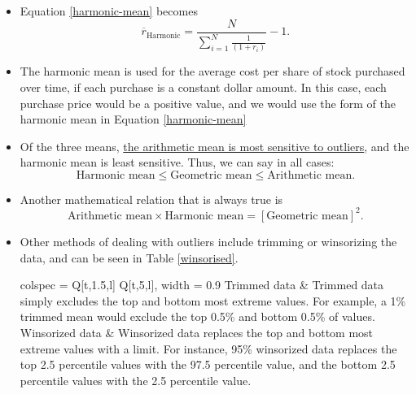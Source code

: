 \documentclass[../notes_compiled.tex]{subfiles}
\begin{document}
\begin{itemize}
\item[] Equation \ref{harmonic-mean} becomes
\begin{equation}
\overline{r}_{\text{Harmonic}} = \frac{N}{\sum_{i=1}^{N}\frac{1}{(1+r_{i})}} -1.
\end{equation}

\item The harmonic mean is used for the average cost per share of stock purchased over time, if each purchase is a constant dollar amount. In this case, each purchase price would be a positive value, and we would use the form of the harmonic mean in Equation \ref{harmonic-mean}

\item Of the three means, \underline{the arithmetic mean is most sensitive to outliers}, and the harmonic mean is least sensitive. Thus, we can say in all cases:
\begin{equation*}
\text{Harmonic mean} \leq \text{Geometric mean} \leq \text{Arithmetic mean}.
\end{equation*}

\item Another mathematical relation that is always true is 
\begin{equation*}
\text{Arithmetic mean} \times \text{Harmonic mean} = \left[\text{Geometric mean}\right]^{2}.
\end{equation*}

\item Other methods of dealing with outliers include trimming or winsorizing the data, and can be seen in Table \ref{winsorised}.

\begin{table}[H]
\centering
\begin{tblr}{colspec = {Q[t,1.5,l] Q[t,5,l]}, width = 0.9\textwidth}
\hline[1.25pt]
Trimmed data & Trimmed data simply excludes the top and bottom most extreme values. For example, a 1\% trimmed mean would exclude the top 0.5\% and bottom 0.5\% of values. \\
Winsorized data & Winsorized data replaces the top and bottom most extreme values with a limit. For instance, 95\% winsorized data replaces the top 2.5 percentile values with the 97.5 percentile value, and the bottom 2.5 percentile values with the 2.5 percentile value.\\
\hline[1.25pt]
\end{tblr}
\caption{Winsorised and trimmed data methods used to deal with outliers}
\label{winsorised}
\end{table}

\end{itemize}
\end{document}
